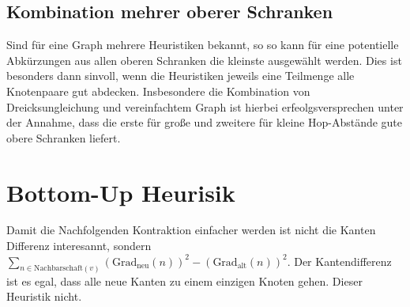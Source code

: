 \subsection{Kombination mehrer oberer Schranken}
Sind für eine Graph mehrere Heuristiken bekannt, so so kann für eine potentielle Abkürzungen aus allen oberen Schranken die kleinste ausgewählt werden.
Dies ist besonders dann sinvoll, wenn die Heuristiken jeweils eine Teilmenge alle Knotenpaare gut abdecken.
Insbesondere die Kombination von Dreicksungleichung und vereinfachtem Graph ist hierbei erfeolgsversprechen unter der Annahme, dass die erste für große und zweitere für kleine Hop-Abstände gute obere Schranken liefert.

\section{Bottom-Up Heurisik}

Damit die Nachfolgenden Kontraktion einfacher werden ist nicht die Kanten Differenz interesannt, sondern $\sum_{n \in \text{Nachbarschaft}(v)} (\text{Grad}_\text{neu}(n))^2 - (\text{Grad}_\text{alt}(n))^2$.
Der Kantendifferenz ist es egal, dass alle neue Kanten zu einem einzigen Knoten gehen. Dieser Heuristik nicht.

